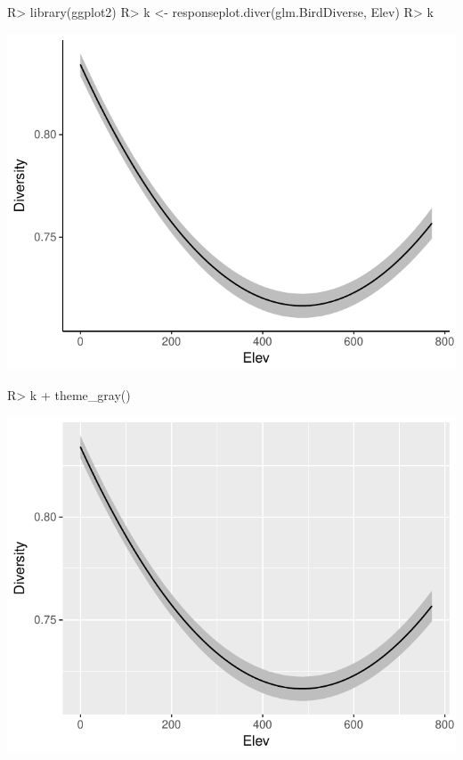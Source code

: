 \documentclass[article]{jss}
\begin{document}
\begin{CodeChunk}

\begin{CodeInput}
R> library(ggplot2)
R> k <- responseplot.diver(glm.BirdDiverse, Elev)
R> k
\end{CodeInput}


\begin{center}\includegraphics{diversityocc_files/figure-latex/unnamed-chunk-26-1} \end{center}


\begin{CodeInput}
R> k + theme_gray()
\end{CodeInput}


\begin{center}\includegraphics{diversityocc_files/figure-latex/unnamed-chunk-26-2} \end{center}



\end{CodeChunk}
\end{document}
